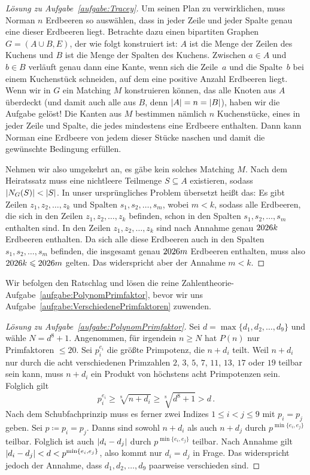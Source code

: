 \begin{proof}[Lösung zu Aufgabe~\ref{aufgabe:Tracey}]
	Um seinen Plan zu verwirklichen, muss Norman $n$ Erdbeeren so auswählen, dass in jeder Zeile und jeder Spalte genau eine dieser Erdbeeren liegt. Betrachte dazu einen bipartiten Graphen $G=(A\cup B,E)$, der wie folgt konstruiert ist: $A$ ist die Menge der Zeilen des Kuchens und $B$ ist die Menge der Spalten des Kuchens. Zwischen $a\in A$ und $b\in B$ verläuft genau dann eine Kante, wenn sich die Zeile~$a$ und die Spalte~$b$ bei einem Kuchenstück schneiden, auf dem eine positive Anzahl Erdbeeren liegt. Wenn wir in $G$ ein Matching $M$ konstruieren können, das alle Knoten aus $A$ überdeckt (und damit auch alle aus $B$, denn $\lvert A\rvert=n=\lvert B\rvert$), haben wir die Aufgabe gelöst! Die Kanten aus $M$ bestimmen nämlich $n$ Kuchenstücke, eines in jeder Zeile und Spalte, die jedes mindestens eine Erdbeere enthalten. Dann kann Norman eine Erdbeere von jedem dieser Stücke naschen und damit die gewünschte Bedingung erfüllen.
	
	Nehmen wir also umgekehrt an, es gäbe kein solches Matching $M$. Nach dem Heiratssatz muss eine nichtleere Teilmenge $S\subseteq A$ existieren, sodass $\lvert N_G(S)\rvert<\lvert S\rvert$. In unser ursprüngliches Problem übersetzt heißt das: Es gibt Zeilen $z_1,z_2,\dotsc,z_k$ und Spalten $s_1,s_2,\dotsc,s_m$, wobei $m<k$, sodass alle Erdbeeren, die sich in den Zeilen $z_1,z_2,\dotsc,z_k$ befinden, schon in den Spalten $s_1,s_2,\dotsc,s_m$ enthalten sind. In den Zeilen $z_1,z_2,\dotsc,z_k$ sind nach Annahme genau $\the\year k$ Erdbeeren enthalten. Da sich alle diese Erdbeeren auch in den Spalten $s_1,s_2,\dotsc,s_m$ befinden, die insgesamt genau $\the\year m$ Erdbeeren enthalten, muss also $\the\year k\leqslant \the\year m$ gelten. Das widerspricht aber der Annahme $m<k$.
\end{proof}

Wir befolgen den Ratschlag und lösen die reine Zahlentheorie-Aufgabe~\ref{aufgabe:PolynomPrimfaktor}, bevor wir uns Aufgabe~\ref{aufgabe:VerschiedenePrimfaktoren} zuwenden.

\begin{proof}[Lösung zu Aufgabe~\ref{aufgabe:PolynomPrimfaktor}]
	Sei $d=\max\{d_1,d_2,\dotsc,d_9\}$ und wähle $N=d^8+1$. Angenommen, für irgendein $n\geqslant N$ hat $P(n)$ nur Primfaktoren $\leqslant 20$. Sei $p_i^{e_i}$ die größte Primpotenz, die $n+d_i$ teilt. Weil $n+d_i$ nur durch die acht verschiedenen Primzahlen $2$, $3$, $5$, $7$, $11$, $13$, $17$ oder $19$ teilbar sein kann, muss $n+d_i$ ein Produkt von höchstens acht Primpotenzen sein. Folglich gilt
	\begin{equation*}
		p_i^{e_i}\geqslant \sqrt[8]{n+d_i}\geqslant \sqrt[8]{d^8+1}>d\,.
	\end{equation*}
	Nach dem Schubfachprinzip muss es ferner zwei Indizes $1\leqslant i<j\leqslant 9$ mit $p_i=p_j$ geben. Sei $p\coloneqq p_i=p_j$. Danns sind sowohl $n+d_i$ als auch $n+d_j$ durch $p^{\min\{e_i,e_j\}}$ teilbar. Folglich ist auch $\lvert d_i-d_j\rvert$ durch $p^{\min\{e_i,e_j\}}$ teilbar. Nach Annahme gilt $\lvert d_i-d_j\rvert<d<p^{\min\{e_i,e_j\}}$, also kommt nur $d_i=d_j$ in Frage. Das widerspricht jedoch der Annahme, dass $d_1,d_2,\dotsc,d_9$ paarweise verschieden sind.
\end{proof}


